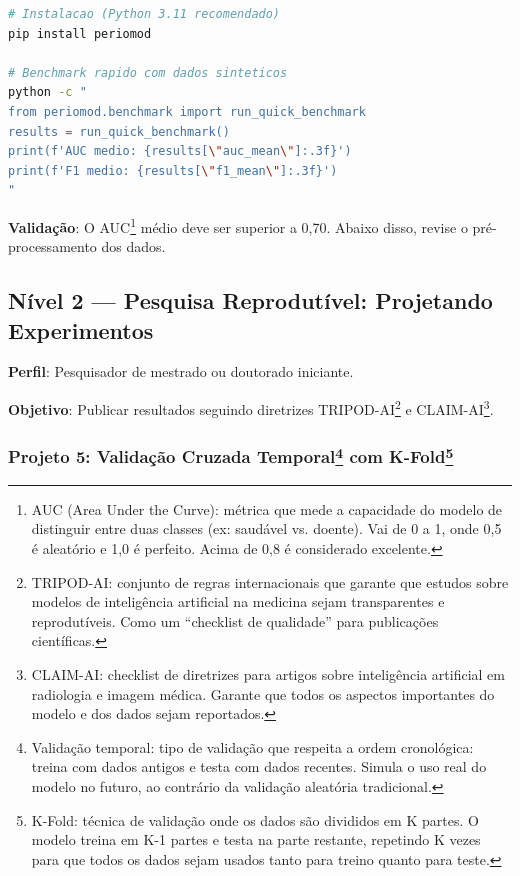 \begin{lstlisting}[language=bash, caption={Instalação e primeiro modelo com Periomod}, label={lst:periomod_install}]
# Instalacao (Python 3.11 recomendado)
pip install periomod

# Benchmark rapido com dados sinteticos
python -c "
from periomod.benchmark import run_quick_benchmark
results = run_quick_benchmark()
print(f'AUC medio: {results[\"auc_mean\"]:.3f}')
print(f'F1 medio: {results[\"f1_mean\"]:.3f}')
"
\end{lstlisting}

\textbf{Validação}: O AUC\protect\footnote{AUC (Area Under the Curve): métrica que mede a capacidade do modelo de distinguir entre duas classes (ex: saudável vs. doente). Vai de 0 a 1, onde 0,5 é aleatório e 1,0 é perfeito. Acima de 0,8 é considerado excelente.} médio deve ser superior a 0,70. Abaixo disso, revise o pré-processamento dos dados.

\subsection{Nível 2 — Pesquisa Reprodutível: Projetando Experimentos}

\textbf{Perfil}: Pesquisador de mestrado ou doutorado iniciante.

\textbf{Objetivo}: Publicar resultados seguindo diretrizes TRIPOD-AI\protect\footnote{TRIPOD-AI: conjunto de regras internacionais que garante que estudos sobre modelos de inteligência artificial na medicina sejam transparentes e reprodutíveis. Como um ``checklist de qualidade'' para publicações científicas.} e CLAIM-AI\protect\footnote{CLAIM-AI: checklist de diretrizes para artigos sobre inteligência artificial em radiologia e imagem médica. Garante que todos os aspectos importantes do modelo e dos dados sejam reportados.}.

\subsubsection*{Projeto 5: Validação Cruzada Temporal\protect\footnote{Validação temporal: tipo de validação que respeita a ordem cronológica: treina com dados antigos e testa com dados recentes. Simula o uso real do modelo no futuro, ao contrário da validação aleatória tradicional.} com K-Fold\protect\footnote{K-Fold: técnica de validação onde os dados são divididos em K partes. O modelo treina em K-1 partes e testa na parte restante, repetindo K vezes para que todos os dados sejam usados tanto para treino quanto para teste.}}

